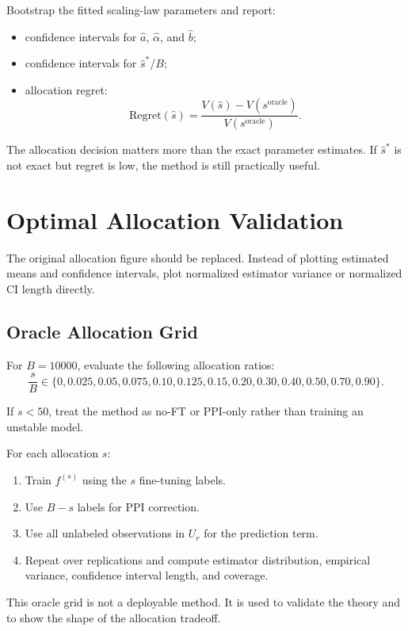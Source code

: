 \documentclass[11pt]{article}
\begin{document}
Bootstrap the fitted scaling-law parameters and report:

\begin{itemize}
    \item confidence intervals for $\hat a$, $\hat\alpha$, and $\hat b$;
    \item confidence intervals for $\hat s^*/B$;
    \item allocation regret:
    \[
    \mathrm{Regret}(\hat s)
    =
    \frac{V(\hat s)-V(s^{\mathrm{oracle}})}{V(s^{\mathrm{oracle}})}.
    \]
\end{itemize}

The allocation decision matters more than the exact parameter estimates. If $\hat s^*$ is not exact but regret is low, the method is still practically useful.

\section{Optimal Allocation Validation}

The original allocation figure should be replaced. Instead of plotting estimated means and confidence intervals, plot normalized estimator variance or normalized CI length directly.

\subsection{Oracle Allocation Grid}

For $B=10000$, evaluate the following allocation ratios:
\[
\frac{s}{B}\in
\{0,0.025,0.05,0.075,0.10,0.125,0.15,0.20,0.30,0.40,0.50,0.70,0.90\}.
\]

If $s<50$, treat the method as no-FT or PPI-only rather than training an unstable model.

For each allocation $s$:

\begin{enumerate}
    \item Train $f^{(s)}$ using the $s$ fine-tuning labels.
    \item Use $B-s$ labels for PPI correction.
    \item Use all unlabeled observations in $U_r$ for the prediction term.
    \item Repeat over replications and compute estimator distribution, empirical variance, confidence interval length, and coverage.
\end{enumerate}

This oracle grid is not a deployable method. It is used to validate the theory and to show the shape of the allocation tradeoff.
\end{document}
